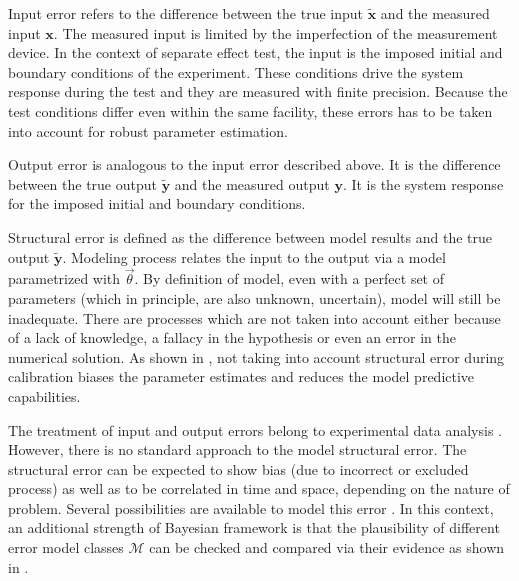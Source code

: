 \documentclass[11pt,titlepage]{article}
\begin{document}
Input error refers to the difference between the true input $\mathbf{\tilde{x}}$ and the measured input $\mathbf{x}$. 
The measured input is limited by the imperfection of the measurement device. 
In the context of separate effect test, the input is the imposed initial and boundary conditions of the experiment. 
These conditions drive the system response during the test and they are measured with finite precision.
Because the test conditions differ even within the same facility, these errors has to be taken into account for robust parameter estimation.

Output error is analogous to the input error described above. 
It is the difference between the true output $\mathbf{\tilde{y}}$ and the measured output $\mathbf{y}$. 
It is the system response for the imposed initial and boundary conditions. 

Structural error is defined as the difference between model results and the true output $\mathbf{\tilde{y}}$. 
Modeling process relates the input to the output via a model parametrized with $\vec{\theta}$. 
By definition of model, even with a perfect set of parameters (which in principle, are also unknown, uncertain), model will still be inadequate. 
There are processes which are not taken into account either because of a lack of knowledge, a fallacy in the hypothesis or even an error in the numerical solution. 
As shown in \cite{KennedyOHagan2001}, not taking into account structural error during calibration biases the parameter estimates and reduces the model predictive capabilities.

The treatment of input and output errors belong to experimental data analysis . 
However, there is no standard approach to the model structural error. 
The structural error can be expected to show bias (due to incorrect or excluded process) as well as to be correlated in time and space, depending on the nature of problem. 
Several possibilities are available to model this error \cite{Simoen2013, Schoups2010}. 
In this context, an additional strength of Bayesian framework is that the plausibility of different error model classes $\mathcal{M}$ can be checked and compared via their evidence as shown in \cite{Beck2010}.
\end{document}
